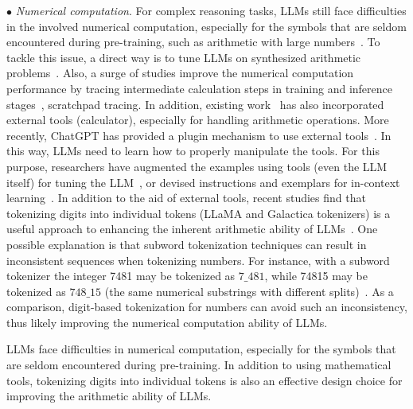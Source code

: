 $\bullet$ \emph{Numerical  computation}.
{For complex reasoning tasks, LLMs still face difficulties in the involved numerical computation, especially for the symbols that are seldom  encountered during pre-training, such as arithmetic with large numbers~\cite{Qian-arxiv-2022-Limitations,Lu-arxiv-2022-Survey,Yuan-arxiv-2023-Arithmetic}. 
To tackle this issue, a direct way is to tune LLMs on synthesized arithmetic problems~\cite{Pi-EMNLP-2022-Reasoning,liu-arxiv-2023-goat}. {Also, a surge of studies improve the numerical computation performance by tracing intermediate calculation steps in training and inference stages~\cite{Nye-arxiv-2021-Show,Zhou-2023-arxiv-Teaching,liu-arxiv-2023-goat}, \eg scratchpad tracing.} 
In addition, existing work~\cite{Schick-arxiv-2023-Toolformer} has also  incorporated  external tools (\eg calculator),  especially for handling arithmetic operations. 
More recently, ChatGPT has provided a plugin mechanism to use external  tools~\cite{OpenAI-blog-2023-plugins}.  
In this way, LLMs need to learn how to properly manipulate the tools. For this purpose,   researchers have augmented  the examples using tools (even the LLM itself) for tuning the LLM~\cite{Parisi-arxiv-2022-TALM,Schick-arxiv-2023-Toolformer}, or devised  instructions and exemplars for in-context learning~\cite{Gao-arxiv-2022-PAL}.} 
{
In addition to the aid of external tools, recent studies find that tokenizing digits into individual tokens (\eg LLaMA and Galactica tokenizers) is a useful approach to enhancing  the inherent arithmetic ability of LLMs~\cite{Yuan-arxiv-2023-Arithmetic,liu-arxiv-2023-goat}.  %
{One possible explanation is that subword tokenization techniques can result in inconsistent sequences when tokenizing numbers. For instance, with a subword tokenizer the integer 7481 may be tokenized as $7\_481$, while 74815 may be tokenized as $748\_15$ (the same numerical substrings with different splits)~\cite{liu-arxiv-2023-goat}.} 
As a comparison, digit-based tokenization for numbers can avoid such an inconsistency, thus likely improving the numerical computation ability of LLMs. 
}

\begin{center}
\begin{tcolorbox}[colback=blue!5!white,colframe=blue!55!black,width=0.46\textwidth,title={Numerical Computation}]
LLMs face difficulties in numerical computation, especially for the symbols that are seldom  encountered during pre-training.
In addition to using mathematical tools, tokenizing digits into individual tokens is also an effective design choice for improving the arithmetic ability of LLMs.
\end{tcolorbox}
\end{center}





